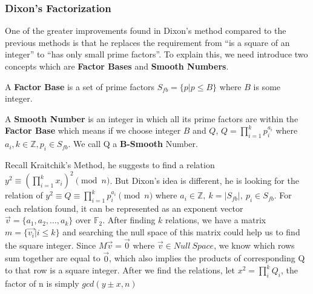 \documentclass[12pt]{article} %
\begin{document}
	\subsubsection {Dixon's Factorization}
	One of the greater improvements found in Dixon's method compared to the previous methods is that he replaces the requirement from ``is a square of an integer'' to ``has only small prime factors''. To explain this, we need introduce two concepts which are \textbf{Factor Bases} and \textbf{Smooth Numbers}.
	
	A \textbf{Factor Base} is a set of prime factors $S_{fb}=\{p | p \le B\}$ where $B$ is some integer.
	
	A \textbf{Smooth Number} is an integer in which all its prime factors are within the \textbf{Factor Base} which means if we choose integer $B$ and $Q$, $Q = \prod_{i=1}^k{p_i^{a_i}}$ where $a_i, k \in \mathbb{Z}, p_i \in S_{fb}$. We call Q a \textbf{B-Smooth} Number.
	
	Recall Kraitchik's Method, he suggests to find a relation $y^2 \equiv \left (\prod_{i=1}^k{x_i}\right)^2 \pmod{n}$. But Dixon's idea is different, he is looking for the relation of $\displaystyle y^2 \equiv Q \equiv \prod_{i=1}^k{p_i^{a_i}} \pmod{n}$ where $a_i \in \mathbb{Z},\ k=|S_{fb}|,\ p_i \in S_{fb}$. For each relation  found, it can be represented as an exponent vector $\vec{v} = \{a_1, a_2, \dots, a_k\}$ over $\mathbb{F}_{2}$. After finding $k$ relations, we have a matrix $m = \{\vec{v_i} | i \le k\}$ and searching the null space of this matrix could help us to find the square integer. Since $M\vec{v} = \vec{0}$ where $\vec{v} \in Null\ Space$, we know which rows sum together are equal to $\vec{0}$, which also implies the products of corresponding Q to that row is a square integer. After we find the relations, let $x^2 = \prod_i^k{Q_i}$, the factor of n is simply $gcd(y\pm x, n)$
	
\end{document}
